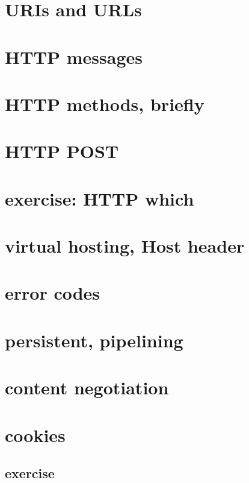 \section{URIs and URLs}


\section{HTTP messages}


\section{HTTP methods, briefly}


\section{HTTP POST}


\section{exercise: HTTP which}


\section{virtual hosting, Host header}


\section{error codes}


\section{persistent, pipelining}


\section{content negotiation}


\section{cookies}


\subsection{exercise}


